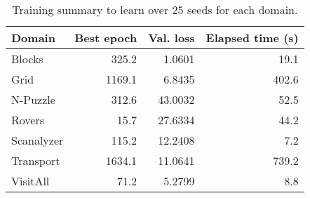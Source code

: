 \begin{table}[!h]
\centering
\caption[Training summary for learning heuristic functions]{Training summary to learn \hnn over $25$ seeds for each domain.}
\label{tab:training_info_hnn}
\vspace{\baselineskip}
\begin{tabular}{lrrr}
\toprule
Domain    &  Best epoch &  Val. loss &  Elapsed time (s) \\
\midrule
Blocks  &       325.2 &      1.0601 &                19.1 \\
Grid &      1169.1 &      6.8435 &               402.6 \\
N-Puzzle &       312.6 &     43.0032 &                52.5 \\
Rovers  &        15.7 &     27.6334 &                44.2 \\
Scanalyzer  &       115.2 &     12.2408 &                 7.2 \\
Transport  &      1634.1 &     11.0641 &               739.2 \\
VisitAll  &        71.2 &      5.2799 &                 8.8 \\
\bottomrule
\end{tabular}
\end{table}


